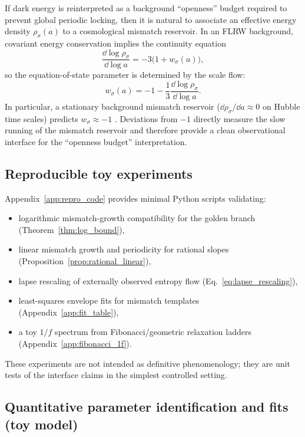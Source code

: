 If dark energy is reinterpreted as a background ``openness'' budget required to prevent global periodic locking, then it is natural to associate an effective energy density $\rho_\sigma(a)$ to a cosmological mismatch reservoir. In an FLRW background, covariant energy conservation implies the continuity equation
\begin{equation}
  \frac{\dd\log\rho_\sigma}{\dd\log a} = -3\bigl(1+w_\sigma(a)\bigr),
\end{equation}
so the equation-of-state parameter is determined by the scale flow:
\begin{equation}
  w_\sigma(a) = -1 - \frac{1}{3}\frac{\dd\log\rho_\sigma}{\dd\log a}.
\label{eq:w_from_rho}
\end{equation}
In particular, a stationary background mismatch reservoir ($\dd\rho_\sigma/\dd a\approx 0$ on Hubble time scales) predicts $w_\sigma\approx -1$ \cite{Weinberg2008,Dodelson2003}. Deviations from $-1$ directly measure the slow running of the mismatch reservoir and therefore provide a clean observational interface for the ``openness budget'' interpretation.

\subsection{Reproducible toy experiments}

Appendix~\ref{app:repro_code} provides minimal Python scripts validating:
\begin{itemize}
  \item logarithmic mismatch-growth compatibility for the golden branch (Theorem~\ref{thm:log_bound}),
  \item linear mismatch growth and periodicity for rational slopes (Proposition~\ref{prop:rational_linear}),
  \item lapse rescaling of externally observed entropy flow (Eq.~\eqref{eq:lapse_rescaling}),
  \item least-squares envelope fits for mismatch templates (Appendix~\ref{app:fit_table}),
  \item a toy $1/f$ spectrum from Fibonacci/geometric relaxation ladders (Appendix~\ref{app:fibonacci_1f}).
\end{itemize}
These experiments are not intended as definitive phenomenology; they are unit tests of the interface claims in the simplest controlled setting.

\subsection{Quantitative parameter identification and fits (toy model)}

